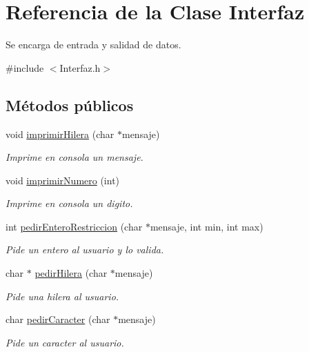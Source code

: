\hypertarget{classInterfaz}{\section{Referencia de la Clase Interfaz}
\label{classInterfaz}
}


Se encarga de entrada y salidad de datos.  




{\ttfamily \#include $<$Interfaz.\-h$>$}

\subsection*{Métodos públicos}
\begin{DoxyCompactItemize}
\item 
void \hyperlink{classInterfaz_ae6fbdd961b4fc185e69e1652d2c72560}{imprimir\-Hilera} (char $\ast$mensaje)
\begin{DoxyCompactList}\small\item\em Imprime en consola un mensaje. \end{DoxyCompactList}\item 
void \hyperlink{classInterfaz_a10c786792b9e1ae657bd08e6247a4144}{imprimir\-Numero} (int)
\begin{DoxyCompactList}\small\item\em Imprime en consola un digito. \end{DoxyCompactList}\item 
int \hyperlink{classInterfaz_a272b4afcea9450ed60271881c4d5d5e6}{pedir\-Entero\-Restriccion} (char $\ast$mensaje, int min, int max)
\begin{DoxyCompactList}\small\item\em Pide un entero al usuario y lo valida. \end{DoxyCompactList}\item 
char $\ast$ \hyperlink{classInterfaz_a971f4279e5debdff50a43c19777fb246}{pedir\-Hilera} (char $\ast$mensaje)
\begin{DoxyCompactList}\small\item\em Pide una hilera al usuario. \end{DoxyCompactList}\item 
char \hyperlink{classInterfaz_a87e7eefe7bbad7b006e08d5d3a56abca}{pedir\-Caracter} (char $\ast$mensaje)
\begin{DoxyCompactList}\small\item\em Pide un caracter al usuario. \end{DoxyCompactList}\end{DoxyCompactItemize}


